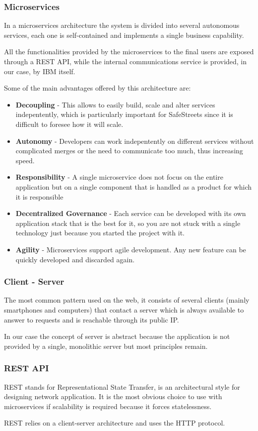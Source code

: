 \subsubsection{Microservices}
In a microservices architecture the system is divided into several autonomous services, each one is self-contained and implements a single business capability.

All the functionalities provided by the microservices to the final users are exposed through a REST API, while the internal communications service is provided, in our case, by IBM itself.

Some of the main advantages offered by this architecture are:
\begin{itemize}
    \item \textbf{Decoupling} - This allows to easily build, scale and alter services indepentently, which is particularly important for SafeStreets since it is difficult to foresee how it will scale.
    \item \textbf{Autonomy} - Developers can work indepentently on different services without complicated merges or the need to communicate too much, thus increasing speed.
    \item \textbf{Responsibility} - A single microservice does not focus on the entire application but on a single component that is handled as a product for which it is responsible
    \item \textbf{Decentralized Governance} - Each service can be developed with its own application stack that is the best for it, so you are not stuck with a single technology just because you started the project with it.
    \item \textbf{Agility} - Microservices support agile development. Any new feature can be quickly developed and discarded again.
\end{itemize}


\subsubsection{Client - Server}
The most common pattern used on the web, it consists of several clients (mainly smartphones and computers) that contact a server which is always available to answer to requests and is reachable through its public IP.

In our case the concept of server is abstract because the application is not provided by a single, monolithic server but most principles remain.

\subsubsection{REST API}
REST stands for Representational State Transfer, is an architectural style for designing network application.
It is the most obvious choice to use with microservices if scalability is required because it forces statelessness.

REST relies on a client-server architecture and uses the HTTP protocol.